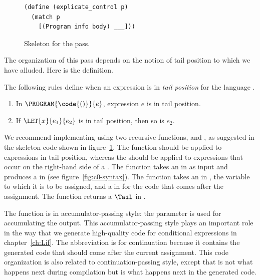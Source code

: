 \documentclass[7x10]{TimesAPriori_MIT}%
\numberwithin{theorem}{chapter}
\numberwithin{definition}{chapter}
\numberwithin{equation}{chapter}
\begin{document}
{\begin{figure}[tbp]
\begin{tcolorbox}[colback=white]
\begin{lstlisting}
(define (explicate_control p)
  (match p
    [(Program info body) ___]))
\end{lstlisting}
\end{tcolorbox}
\caption{Skeleton for the  pass.}
\label{fig:explicate-control-Lvar}
\end{figure}

The organization of this pass depends on the notion of tail position
to which we have alluded. Here is the definition.

\begin{definition}\normalfont
  The following rules define when an expression is in \emph{tail
  position} for the language \LangVar{}.
\begin{enumerate}
\item In $\PROGRAM{\code{()}}{e}$, expression $e$ is in tail position.
\item If $\LET{x}{e_1}{e_2}$ is in tail position, then so is $e_2$.
\end{enumerate}
\end{definition}

We recommend implementing  using two
recursive functions,  and
, as suggested in the skeleton code shown in
figure~\ref{fig:explicate-control-Lvar}.  The 
function should be applied to expressions in tail position, whereas the
 should be applied to expressions that occur on
the right-hand side of a .
%
The  function takes an \Exp{} in \LangVar{} as
input and produces a \Tail{} in \LangCVar{} (see
figure~\ref{fig:c0-syntax}).
%
The  function takes an \Exp{} in \LangVar{},
the variable to which it is to be assigned, and a \Tail{} in
\LangCVar{} for the code that comes after the assignment.  The
 function returns a $\Tail$ in \LangCVar{}.

The  function is in accumulator-passing style:
the  parameter is used for accumulating the output. This
accumulator-passing style plays an important role in the way that we
generate high-quality code for conditional expressions in
chapter~\ref{ch:Lif}.  The abbreviation  is for
continuation because it contains the generated code that should come
after the current assignment.  This code organization is also related
to continuation-passing style, except that  is not what
happens next during compilation but is what happens next in the
generated code.

}
\end{document}
